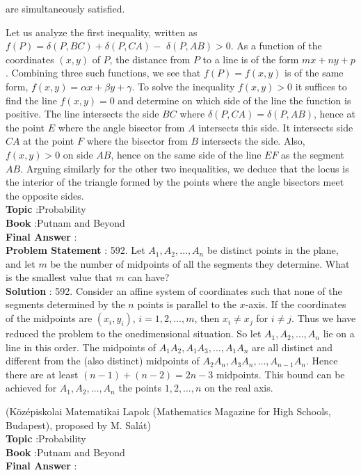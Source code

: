 \documentclass[10pt]{article}
\begin{document}
are simultaneously satisfied.

Let us analyze the first inequality, written as $f(P)=\delta(P, B C)+\delta(P, C A)-$ $\delta(P, A B)>0$. As a function of the coordinates $(x, y)$ of $P$, the distance from $P$ to a line is of the form $m x+n y+p$. Combining three such functions, we see that $f(P)=f(x, y)$ is of the same form, $f(x, y)=\alpha x+\beta y+\gamma$. To solve the inequality $f(x, y)>0$ it suffices to find the line $f(x, y)=0$ and determine on which side of the line the function is positive. The line intersects the side $B C$ where $\delta(P, C A)=\delta(P, A B)$, hence at the point $E$ where the angle bisector from $A$ intersects this side. It intersects side $C A$ at the point $F$ where the bisector from $B$ intersects the side. Also, $f(x, y)>0$ on side $A B$, hence on the same side of the line $E F$ as the segment $A B$. Arguing similarly for the other two inequalities, we deduce that the locus is the interior of the triangle formed by the points where the angle bisectors meet the opposite sides.
\\
\textbf{Topic} :Probability\\
\textbf{Book} :Putnam and Beyond\\
\textbf{Final Answer} :\\


\textbf{Problem Statement} :
592. Let $A_{1}, A_{2}, \ldots, A_{n}$ be distinct points in the plane, and let $m$ be the number of midpoints of all the segments they determine. What is the smallest value that $m$ can have?
\\
\textbf{Solution} :
592. Consider an affine system of coordinates such that none of the segments determined by the $n$ points is parallel to the $x$-axis. If the coordinates of the midpoints are $\left(x_{i}, y_{i}\right)$, $i=1,2, \ldots, m$, then $x_{i} \neq x_{j}$ for $i \neq j$. Thus we have reduced the problem to the onedimensional situation. So let $A_{1}, A_{2}, \ldots, A_{n}$ lie on a line in this order. The midpoints of $A_{1} A_{2}, A_{1} A_{3}, \ldots, A_{1} A_{n}$ are all distinct and different from the (also distinct) midpoints of $A_{2} A_{n}, A_{3} A_{n}, \ldots, A_{n-1} A_{n}$. Hence there are at least $(n-1)+(n-2)=2 n-3$ midpoints. This bound can be achieved for $A_{1}, A_{2}, \ldots, A_{n}$ the points $1,2, \ldots, n$ on the real axis.

(Középiskolai Matematikai Lapok (Mathematics Magazine for High Schools, Budapest), proposed by M. Salát)
\\
\textbf{Topic} :Probability\\
\textbf{Book} :Putnam and Beyond\\
\textbf{Final Answer} :\\
\end{document}
